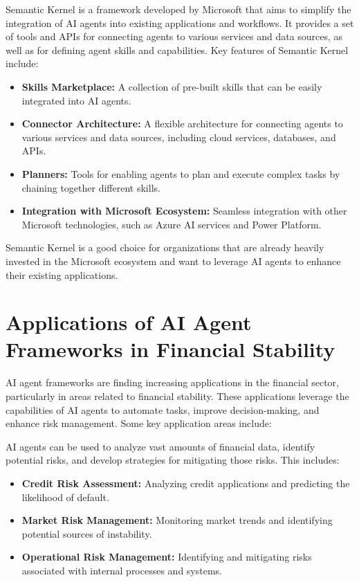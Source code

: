 \documentclass[a4paper,headinclude=on,footinclude=on,12pt,oneside]{scrbook}
\begin{document}

Semantic Kernel is a framework developed by Microsoft that aims to simplify the integration of AI agents into existing applications and workflows. It provides a set of tools and APIs for connecting agents to various services and data sources, as well as for defining agent skills and capabilities. Key features of Semantic Kernel include:

\begin{itemize}
\item \textbf{Skills Marketplace:}  A collection of pre-built skills that can be easily integrated into AI agents.
\item \textbf{Connector Architecture:}  A flexible architecture for connecting agents to various services and data sources, including cloud services, databases, and APIs.
\item \textbf{Planners:} Tools for enabling agents to plan and execute complex tasks by chaining together different skills.
\item \textbf{Integration with Microsoft Ecosystem:} Seamless integration with other Microsoft technologies, such as Azure AI services and Power Platform.
\end{itemize}

Semantic Kernel is a good choice for organizations that are already heavily invested in the Microsoft ecosystem and want to leverage AI agents to enhance their existing applications.

\section*{Applications of AI Agent Frameworks in Financial Stability}

AI agent frameworks are finding increasing applications in the financial sector, particularly in areas related to financial stability. These applications leverage the capabilities of AI agents to automate tasks, improve decision-making, and enhance risk management. Some key application areas include:


AI agents can be used to analyze vast amounts of financial data, identify potential risks, and develop strategies for mitigating those risks. This includes:

\begin{itemize}
\item \textbf{Credit Risk Assessment:} Analyzing credit applications and predicting the likelihood of default.
\item \textbf{Market Risk Management:} Monitoring market trends and identifying potential sources of instability.
\item \textbf{Operational Risk Management:} Identifying and mitigating risks associated with internal processes and systems.
\end{itemize}
\end{document}
